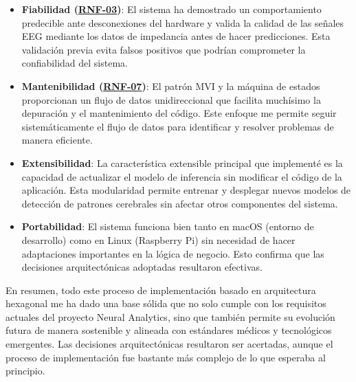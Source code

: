 \begin{itemize}
    \item \textbf{Fiabilidad (\hyperref[rnf-03]{RNF-03})}: El sistema ha demostrado un comportamiento predecible ante desconexiones del hardware y valida la calidad de las señales EEG mediante los datos de impedancia antes de hacer predicciones. Esta validación previa evita falsos positivos que podrían comprometer la confiabilidad del sistema.
    
    \item \textbf{Mantenibilidad (\hyperref[rnf-07]{RNF-07})}: El patrón MVI y la máquina de estados proporcionan un flujo de datos unidireccional que facilita muchísimo la depuración y el mantenimiento del código. Este enfoque me permite seguir sistemáticamente el flujo de datos para identificar y resolver problemas de manera eficiente.
    
    \item \textbf{Extensibilidad}: La característica extensible principal que implementé es la capacidad de actualizar el modelo de inferencia sin modificar el código de la aplicación. Esta modularidad permite entrenar y desplegar nuevos modelos de detección de patrones cerebrales sin afectar otros componentes del sistema.
    
    \item \textbf{Portabilidad}: El sistema funciona bien tanto en macOS (entorno de desarrollo) como en Linux (Raspberry Pi) sin necesidad de hacer adaptaciones importantes en la lógica de negocio. Esto confirma que las decisiones arquitectónicas adoptadas resultaron efectivas.
\end{itemize}

En resumen, todo este proceso de implementación basado en arquitectura hexagonal me ha dado una base sólida que no solo cumple con los requisitos actuales del proyecto Neural Analytics, sino que también permite su evolución futura de manera sostenible y alineada con estándares médicos y tecnológicos emergentes. Las decisiones arquitectónicas resultaron ser acertadas, aunque el proceso de implementación fue bastante más complejo de lo que esperaba al principio.